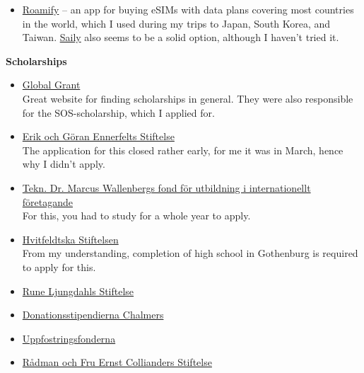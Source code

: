 \begin{itemize}
    \item \href{https://www.google.com/url?sa=t&source=web&rct=j&opi=89978449&url=https://apps.apple.com/ca/app/roamify-travel-esim-data-call/id6472396976&ved=2ahUKEwi7y9-96omOAxUIJhAIHZvSAG0QFnoECAsQAQ&usg=AOvVaw2EyfUaHaPZfjNMj43MYdyp}{Roamify} -- an app for buying eSIMs with data plans covering most countries in the world, which I used during my trips to Japan, South Korea, and Taiwan. \href{https://www.google.com/url?sa=t&source=web&rct=j&opi=89978449&url=https://apps.apple.com/us/app/saily-esim-data-for-travel/id6475045151&ved=2ahUKEwj0--rxg5COAxUnQVUIHQuCDZsQFnoECDkQAQ&usg=AOvVaw04URgsyL163pOjndjnyKxH}{Saily} also seems to be a solid option, although I haven't tried it.
\end{itemize}

\textbf{Scholarships}
\begin{itemize}
    \item \href{https://www.globalgrant.com}{Global Grant} \\ Great website for finding scholarships in general. They were also responsible for the SOS-scholarship, which I applied for.
    \item \href{https://egefonden.se}{Erik och Göran Ennerfelts Stiftelse} \\ The application for this closed rather early, for me it was in March, hence why I didn't apply.
    \item \href{https://tmw.wallenberg.org/anslagsguide}{Tekn. Dr. Marcus Wallenbergs fond för utbildning i internationellt företagande} \\ For this, you had to study for a whole year to apply.
    \item \href{https://wp.hvitfeldtskastiftelsen.se/universitetsstipendium/}{Hvitfeldtska Stiftelsen} \\ From my understanding, completion of high school in Gothenburg is required to apply for this.
    \item \href{https://stiftelsenrljs.se/hogre-studier/}{Rune Ljungdahls Stiftelse}
    \item \href{https://www.chalmers.se/utbildning/studera-hos-oss/studentliv/stipendier-for-studenter/donationsstipendierna/}{Donationsstipendierna Chalmers}
    \item \href{https://www.uppfostringsfonderna.se}{Uppfostringsfonderna}
    \item \href{https://stiftelsemedel.se/rdman-och-fru-ernst-collianders-stiftelse-fr-vlgrande-ndaml/}{Rådman och Fru Ernst Collianders Stiftelse}
\end{itemize}
